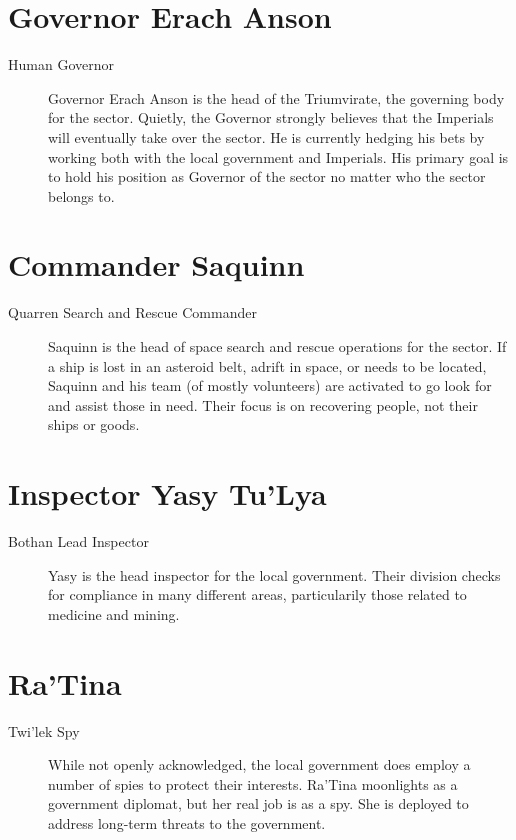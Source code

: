 \documentclass{article}
\begin{document}
\section{Governor Erach Anson}
\begin{description}
	\item [Human \male Governor] Governor Erach Anson is the head of the Triumvirate, the governing body for the sector. Quietly, the Governor strongly believes that the Imperials will eventually take over the sector. He is currently hedging his bets by working both with the local government and Imperials. His primary goal is to hold his position as Governor of the sector no matter who the sector belongs to.
\end{description}
\section{Commander Saquinn}
\begin{description}
	\item [Quarren \male Search and Rescue Commander] Saquinn is the head of space search and rescue operations for the sector. If a ship is lost in an asteroid belt, adrift in space, or needs to be located, Saquinn and his team (of mostly volunteers) are activated to go look for and assist those in need. Their focus is on recovering people, not their ships or goods.
\end{description}
\section{Inspector Yasy Tu’Lya}
\begin{description}
	\item [Bothan \female Lead Inspector] Yasy is the head inspector for the local government. Their division checks for compliance in many different areas, particularily those related to medicine and mining.
\end{description}
\section{Ra’Tina}
\begin{description}
	\item [Twi’lek \female Spy] While not openly acknowledged, the local government does employ a number of spies to protect their interests. Ra’Tina moonlights as a government diplomat, but her real job is as a spy. She is deployed to address long-term threats to the government.
\end{description}
\end{document}
